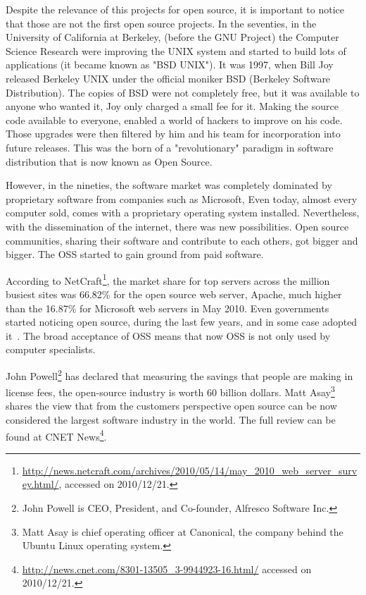 Despite the relevance of this projects for open source, it is important to notice that those are not the first open source projects. 
In the seventies, in the University of California at Berkeley, 
(before the GNU Project) the Computer Science Research 
were improving the UNIX system and started to build lots of applications (it became known as "BSD UNIX").
It was 1997, when Bill Joy released Berkeley UNIX under the official moniker BSD (Berkeley Software Distribution).
The copies of BSD were not completely free, but it was available to anyone who wanted it,
Joy only charged a small fee for it.
Making the source code available to everyone, enabled a world of hackers to improve on his code. 
Those upgrades were then filtered by him and his team for incorporation into future releases. 
This was the born of a "revolutionary" paradigm in software distribution that is now known as Open Source.

However, in the nineties, the software market was completely dominated 
by proprietary software from companies such as Microsoft,
Even today, almost every computer sold,
comes with a proprietary operating system installed.
Nevertheless, with the dissemination of the internet, there was new possibilities. 
Open source communities, sharing their software and contribute to each others, got bigger and bigger.
The OSS started to gain ground from paid software.

According to \textsf{NetCraft}\footnote{\url{http://news.netcraft.com/archives/2010/05/14/may\_2010\_web\_server\_survey.html/}, accessed on 2010/12/21.},
the market share for top servers across the million busiest sites was 66.82\% for the open source web server, Apache,
much higher than the 16.87\% for Microsoft web servers in May 2010.
Even governments started noticing open source, during the last few years, and in some case adopted it~\cite{hahn2002government}.
The broad acceptance of OSS means that now OSS is not only used by computer specialists.

\textsf{John Powell}\footnote{John Powell is CEO, President, and Co-founder, Alfresco Software Inc.}
has declared that measuring the savings that people are making in license fees, the open-source industry is worth 60 billion dollars.
\textsf{Matt Asay}\footnote{Matt Asay is chief operating officer at Canonical, the company behind the Ubuntu Linux operating system.}
shares the view that from the customers perspective open source can be now considered the largest software industry in the world.
The full review can be found at \textsf{CNET News}\footnote{\url{http://news.cnet.com/8301-13505\_3-9944923-16.html/} accessed on 2010/12/21.}. 

